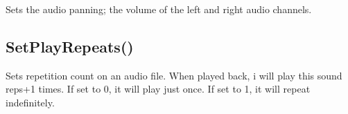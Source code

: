 \documentclass[letterpaper,10pt,english]{sphinxmanual}
\begin{document}
\sphinxAtStartPar
{}

\sphinxAtStartPar
Sets the audio panning; the volume of the left and right audio channels.

\sphinxAtStartPar
{}

\begin{sphinxVerbatim}[commandchars=\\\{\}]
\end{sphinxVerbatim}

\sphinxAtStartPar
{}

\begin{sphinxVerbatim}[commandchars=\\\{\}]
\end{sphinxVerbatim}

\sphinxAtStartPar
{}

\sphinxAtStartPar
{}

\ignorespaces 

\subsection{SetPlayRepeats()}
\label{\detokenize{reference/peblobjects:setplayrepeats}}\label{\detokenize{reference/peblobjects:index-51}}
\sphinxAtStartPar
{}

\sphinxAtStartPar
{}

\sphinxAtStartPar
Sets repetition count on an audio file.  When played back, i   will play this sound reps+1 times. If set to 0, it will play just once.  If set to \sphinxhyphen{}1, it   will repeat indefinitely.
\end{document}
